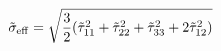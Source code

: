 \documentclass[../main.tex]{subfiles}
\begin{document}




\begin{align}
    \tilde{\sigma}_{\rm{eff}} &= \sqrt{\frac{3}{2}(\tilde{\tau}_{11}^2 + \tilde{\tau}_{22}^2 + \tilde{\tau}_{33}^2 + 2\tilde{\tau}_{12}^2) }
\end{align}



\end{document}
